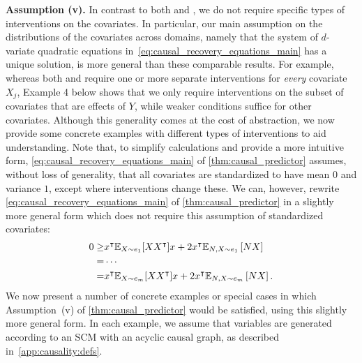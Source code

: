 \documentclass{article}
\begin{document}
%
%


%
%
%
%
%
%
%
%
%
%
%
%
%
%
%
%
%

\textbf{Assumption (v).} In contrast to both \citet{peters2016causal} and \citet{krueger21rex}, we do not require specific types of interventions on the covariates. In particular, our main assumption on the distributions of the covariates across domains, namely that the system of $d$-variate quadratic equations in~\eqref{eq:causal_recovery_equations_main} has a unique solution,
%
is more general than these comparable results. For example, whereas both \citet{peters2016causal} and \citet{krueger21rex} require one or more separate interventions for \emph{every} covariate $X_j$, Example 4 below shows that we only require interventions on the subset of covariates that are effects of $Y$, while weaker conditions suffice for other covariates. Although this generality comes at the cost of abstraction, we now provide some concrete examples with different types of interventions to aid understanding. Note that, to simplify calculations and provide a more intuitive form, \eqref{eq:causal_recovery_equations_main} of \cref{thm:causal_predictor} assumes, without loss of generality, that all covariates are standardized to have mean $0$ and variance $1$, except where interventions change these. We can, however, rewrite \eqref{eq:causal_recovery_equations_main} of \cref{thm:causal_predictor} in a slightly more general form which does not require this assumption of standardized covariates:
\begin{align}
    \notag
    0 \geq
    & x^\intercal \mathbb{E}_{X \sim e_1}[X X^\intercal] x
        + 2 x^\intercal \mathbb{E}_{N,X \sim e_1} \left[ N X \right] \\
    \notag
    = & \cdots \\
    \label{eq:causal_recovery_equations_app}
    = & x^\intercal \mathbb{E}_{X \sim e_m}[X X^\intercal] x
        + 2 x^\intercal \mathbb{E}_{N,X \sim e_m} \left[ N X \right].
\end{align}
%
%
%
%
%
%
%
%
%
%
%
%
We now present a number of concrete examples or special cases in which Assumption~(v) of \cref{thm:causal_predictor} would be satisfied, using this slightly more general form. In each example, we assume that variables are generated according to an SCM with an acyclic causal graph, as described in~\cref{app:causality:defs}.
%
%

%
%
\end{document}
